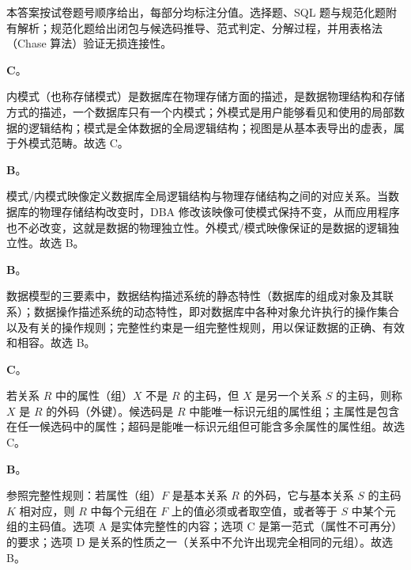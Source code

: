 \documentclass[a4paper,11pt]{article}
\begin{document}

本答案按试卷题号顺序给出，每部分均标注分值。选择题、SQL 题与规范化题附有解析；规范化题给出闭包与候选码推导、范式判定、分解过程，并用表格法（Chase 算法）验证无损连接性。


\q \textbf{C}。
\begin{analysis}
内模式（也称存储模式）是数据库在物理存储方面的描述，是数据物理结构和存储方式的描述，一个数据库只有一个内模式；外模式是用户能够看见和使用的局部数据的逻辑结构；模式是全体数据的全局逻辑结构；视图是从基本表导出的虚表，属于外模式范畴。故选 C。
\end{analysis}

\q \textbf{B}。
\begin{analysis}
模式/内模式映像定义数据库全局逻辑结构与物理存储结构之间的对应关系。当数据库的物理存储结构改变时，DBA 修改该映像可使模式保持不变，从而应用程序也不必改变，这就是数据的物理独立性。外模式/模式映像保证的是数据的逻辑独立性。故选 B。
\end{analysis}

\q \textbf{B}。
\begin{analysis}
数据模型的三要素中，数据结构描述系统的静态特性（数据库的组成对象及其联系）；数据操作描述系统的动态特性，即对数据库中各种对象允许执行的操作集合以及有关的操作规则；完整性约束是一组完整性规则，用以保证数据的正确、有效和相容。故选 B。
\end{analysis}

\q \textbf{C}。
\begin{analysis}
若关系 $R$ 中的属性（组）$X$ 不是 $R$ 的主码，但 $X$ 是另一个关系 $S$ 的主码，则称 $X$ 是 $R$ 的外码（外键）。候选码是 $R$ 中能唯一标识元组的属性组；主属性是包含在任一候选码中的属性；超码是能唯一标识元组但可能含多余属性的属性组。故选 C。
\end{analysis}

\q \textbf{B}。
\begin{analysis}
参照完整性规则：若属性（组）$F$ 是基本关系 $R$ 的外码，它与基本关系 $S$ 的主码 $K$ 相对应，则 $R$ 中每个元组在 $F$ 上的值必须或者取空值，或者等于 $S$ 中某个元组的主码值。选项 A 是实体完整性的内容；选项 C 是第一范式（属性不可再分）的要求；选项 D 是关系的性质之一（关系中不允许出现完全相同的元组）。故选 B。
\end{analysis}
\end{document}
